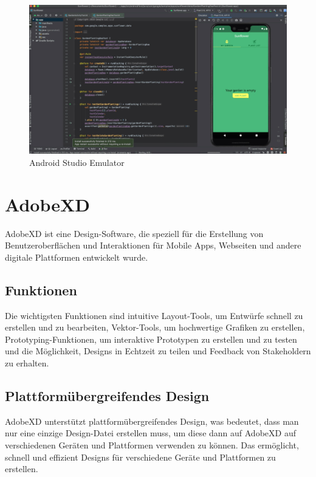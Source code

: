 \begin{figure}[H]
    \centering
    \includegraphics[scale=0.2]{pics/android-studio-emulator.jpg}
    \caption{Android Studio Emulator}
\end{figure}

\section{AdobeXD}

    AdobeXD ist eine Design-Software, die speziell für die Erstellung von Benutzeroberflächen und Interaktionen für Mobile Apps, Webseiten und andere digitale Plattformen entwickelt wurde.

\subsection*{Funktionen}
Die wichtigsten Funktionen sind intuitive Layout-Tools, um Entwürfe schnell zu erstellen und zu bearbeiten, Vektor-Tools, um hochwertige Grafiken zu erstellen, Prototyping-Funktionen, um interaktive Prototypen zu erstellen und zu testen und die Möglichkeit, Designs in Echtzeit zu teilen und Feedback von Stakeholdern zu erhalten.

\subsection*{Plattformübergreifendes Design} 
AdobeXD unterstützt plattformübergreifendes Design, was bedeutet, dass man nur eine einzige Design-Datei erstellen muss, um diese dann auf AdobeXD auf verschiedenen Geräten und Plattformen verwenden zu können. 
Das ermöglicht, schnell und effizient Designs für verschiedene Geräte und Plattformen zu erstellen.

